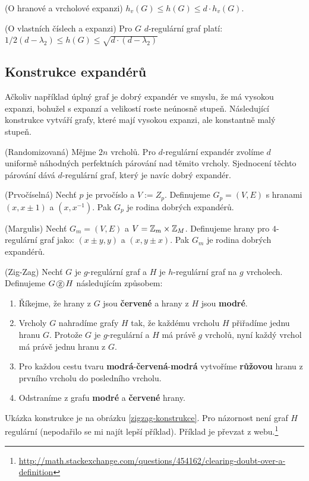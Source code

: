 \poz (O hranové a vrcholové expanzi) $h_v(G) \leq h(G) \leq d \cdot h_v(G)$.

\vt (O vlastních číslech a expanzi) Pro $G$ $d$-regulární graf platí: $1/2(d -
\lambda_2) \leq h(G) \leq \sqrt{d \cdot (d - \lambda_2)}$

\subsection{Konstrukce expandérů}

Ačkoliv například úplný graf je dobrý expandér ve smyslu, že má vysokou
expanzi, bohužel s expanzí a velikostí roste neúnosně stupeň. Následující
konstrukce vytváří grafy, které mají vysokou expanzi, ale konstantně malý
stupeň.

\vt (Randomizovaná) Mějme $2n$ vrcholů. Pro $d$-regulární expandér zvolíme $d$
uniformě náhodných perfektních párování nad těmito vrcholy. Sjednocení těchto
párování dává $d$-regulární graf, který je navíc dobrý expandér.

\vt (Prvočíselná) Nechť $p$ je prvočíslo a $V:=Z_p$. Definujeme $G_p=(V,E)$ s
hranami $(x, x\pm 1)$ a $(x,x^{-1})$. Pak $G_p$ je rodina dobrých expandérů.

\vt (Margulis) Nechť $G_m=(V,E)$ a $V=\mathbb{Z}_m \times \mathbb{Z}_M$. Definujeme hrany pro
$4$-regulární graf jako: $(x\pm y, y)$ a $(x,y\pm x)$. Pak $G_m$ je rodina
dobrých expandérů.

\df (Zig-Zag) Nechť $G$ je $g$-regulární graf a $H$ je $h$-regulární graf na $g$
vrcholech. Definujeme $G \zz H$ následujícím způsobem:
\begin{enumerate}
	\item Říkejme, že hrany z $G$ jsou {\bf\color{red}červené} a hrany z $H$
		jsou {\bf\color{blue}modré}.
	\item Vrcholy $G$ nahradíme grafy $H$ tak, že každému vrcholu $H$ přiřadíme
	jednu hranu $G$. Protože $G$ je $g$-regulární a $H$ má právě $g$ vrcholů,
	nyní každý vrchol má právě jednu hranu z $G$.
	\item Pro každou cestu tvaru
		{\bf\color{blue}modrá}-{\bf\color{red}červená}-{\bf\color{blue}modrá}
		vytvoříme {\bf\color{magenta}růžovou} hranu z prvního vrcholu do
		posledního vrcholu.
	\item Odstraníme z grafu {\bf\color{blue}modré} a {\bf\color{red}červené}
		hrany.
\end{enumerate}
Ukázka konstrukce je na obrázku \ref{zigzag-konstrukce}. Pro názornost není
graf $H$ regulární (nepodařilo se mi najít lepší příklad). Příklad je převzat z
webu.\footnote{\url{http://math.stackexchange.com/questions/454162/clearing-doubt-over-a-definition}}

